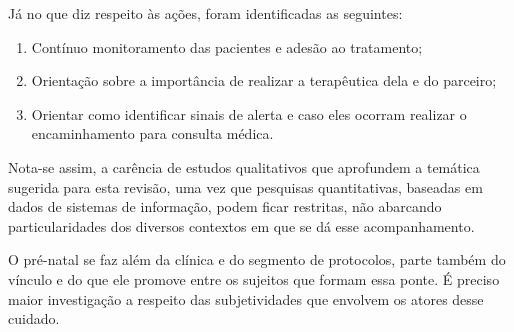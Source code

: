 Já no que diz respeito às ações, foram identificadas as seguintes: 

\begin{enumerate}
\item Contínuo monitoramento das pacientes e adesão ao tratamento; 
\item Orientação sobre a importância de realizar a terapêutica dela e do parceiro;
\item Orientar como identificar sinais de alerta e caso eles ocorram realizar o encaminhamento para consulta médica. 
\end{enumerate}

Nota-se assim, a carência de estudos qualitativos que aprofundem a temática sugerida para esta revisão, uma vez que pesquisas quantitativas, baseadas em dados de sistemas de informação, podem ficar restritas, não abarcando particularidades dos diversos contextos em que se dá esse acompanhamento. 

O pré-natal se faz além da clínica e do segmento de protocolos, parte também do vínculo e do que ele promove entre os sujeitos que formam essa ponte. É preciso maior investigação a respeito das subjetividades que envolvem os atores desse cuidado. 
